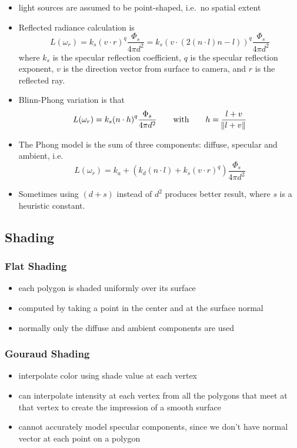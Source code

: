 \documentclass[twocolumn,landscape,10pt]{article}
\theoremstyle{definition}
\begin{document}
\begin{itemize}
    \item light sources are assumed to be point-shaped, i.e.\ no spatial extent
    \item Reflected radiance calculation is
        \[
            L(\omega_r) = k_s{(v\cdot r)}^{q}\frac{\Phi_s}{4\pi d^2}
            = k_s{(v\cdot (2(n\cdot l)n - l))}^{q}\frac{\Phi_s}{4\pi d^2}
        \]
        where $k_s$ is the specular reflection coefficient, $q$ is the specular
        reflection exponent, $v$ is the direction vector from surface to camera,
        and $r$ is the reflected ray.
    \item Blinn-Phong variation is that
        \[
            L(\omega_r) = k_s{(n\cdot h)}^{q}\frac{\Phi_s}{4\pi d^2}
            \qquad\text{with}\qquad
            h=\frac{l+v}{\norm{l+v}}
        \]
    \item The Phong model is the sum of three components: diffuse, specular and
        ambient, i.e.\
        \[
            L(\omega_r)=k_a + \left(k_d(n\cdot l)+k_s{(v\cdot r)}^{q}\right)
            \frac{\Phi_s}{4\pi d^2}
        \]
    \item Sometimes using $(d+s)$ instead of $d^2$ produces better result, where
        $s$ is a heuristic constant.
\end{itemize} 

\subsection{Shading}

\subsubsection{Flat Shading}

\begin{itemize}
    \item each polygon is shaded uniformly over its surface
    \item computed by taking a point in the center and at the surface normal
    \item normally only the diffuse and ambient components are used
\end{itemize} 

\subsubsection{Gouraud Shading}

\begin{itemize}
    \item interpolate color using shade value at each vertex
    \item can interpolate intensity at each vertex from all the polygons that
        meet at that vertex to create the impression of a smooth surface
    \item cannot accurately model specular components,
        since we don't have normal vector at each point on a polygon
\end{itemize} 
\end{document}
